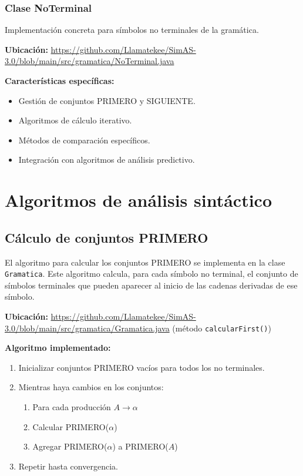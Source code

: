 \subsubsection{Clase NoTerminal}

Implementación concreta para símbolos no terminales de la gramática.

\textbf{Ubicación:} \url{https://github.com/Llamatekee/SimAS-3.0/blob/main/src/gramatica/NoTerminal.java}

\textbf{Características específicas:}
\begin{itemize}
    \item Gestión de conjuntos PRIMERO y SIGUIENTE.
    \item Algoritmos de cálculo iterativo.
    \item Métodos de comparación específicos.
    \item Integración con algoritmos de análisis predictivo.
\end{itemize}

\section{Algoritmos de análisis sintáctico}

\subsection{Cálculo de conjuntos PRIMERO}

El algoritmo para calcular los conjuntos PRIMERO se implementa en la clase \texttt{Gramatica}. Este algoritmo calcula, para cada símbolo no terminal, el conjunto de símbolos terminales que pueden aparecer al inicio de las cadenas derivadas de ese símbolo.

\textbf{Ubicación:} \url{https://github.com/Llamatekee/SimAS-3.0/blob/main/src/gramatica/Gramatica.java} (método \texttt{calcularFirst()})

\textbf{Algoritmo implementado:}
\begin{enumerate}
    \item Inicializar conjuntos PRIMERO vacíos para todos los no terminales.
    \item Mientras haya cambios en los conjuntos:
    \begin{enumerate}
        \item Para cada producción $A \rightarrow \alpha$
        \item Calcular PRIMERO($\alpha$)
        \item Agregar PRIMERO($\alpha$) a PRIMERO($A$)
    \end{enumerate}
    \item Repetir hasta convergencia.
\end{enumerate}

